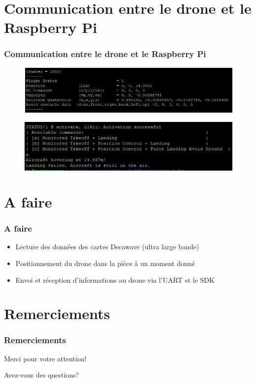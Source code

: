 \documentclass[12pt]{beamer}
\begin{document}
	\section{Communication entre le drone et le Raspberry Pi}	
	\begin{frame}[allowframebreaks]
    	\frametitle{Communication entre le drone et le Raspberry Pi}
    	    \begin{figure}[H]
				\centering
				\includegraphics[scale=0.62]{telemetry.png}
			\end{figure}
			\begin{figure}[H]
				\centering
				\includegraphics[scale=0.65]{flightcontrol.png}
			\end{figure}
	\end{frame}
	\section{A faire}
	\begin{frame}
	\frametitle{A faire}
	    \begin{alertblock}{}
    	    \begin{itemize}
    	    [triangle]
    	        \item Lecture des données des cartes Decawave (ultra large bande)
    	        \item Positionnement du drone dans la pièce à un moment donné
    	        \item Envoi et réception d'informations au drone via l'UART et le SDK
    	    \end{itemize}
	    \end{alertblock}
	\end{frame}
	\section*{Remerciements}
	\begin{frame}
	\frametitle{Remerciements}
		\begin{center}
		Merci pour votre attention!

		\bigbreak
		Avez-vous des questions?
		\end{center}
	\end{frame}
	
\end{document}
